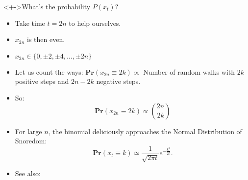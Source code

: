 \begin{frame}

  \begin{block}<+->{What's the probability $P(x_{t})$?}
    \begin{itemize}
    \item<+->
      Take time $t=2n$ to help ourselves.
    \item<+->
      $x_{2n}$ is then even.
    \item<+->
      $x_{2n} \in \{0, \pm 2, \pm 4, \ldots, \pm 2n\}$
    \item<+->
      Let us count the ways: \newline
      $
      \mathbf{Pr}(x_{2n} \equiv 2k) 
      \propto 
      $
      Number of random walks with $2k$ positive
      steps and $2n - 2k$ negative steps.
    \item<+->
      So:
      $$
      \mathbf{Pr}(x_{2n} \equiv 2k) 
      \propto 
      \binom{2n}{2k}
      $$
    \item<+->
      For large $n$, the binomial
      deliciously approaches the Normal Distribution of Snoredom:
      $$
      \mathbf{Pr}(x_{t} \equiv k) 
      \simeq
      \frac{1}{\sqrt{2\pi t}}
      e^{-\frac{k^2}{2t}}.
      $$
    \item<+-> 
      See also: 
    \end{itemize}
  \end{block}

\end{frame}
